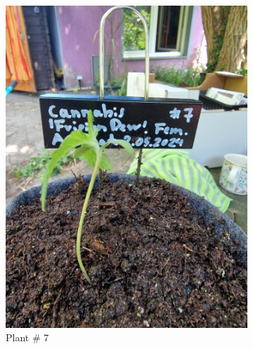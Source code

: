 \begin{figure}[htbp]
\begin{subfigure}[t]{.19\textwidth}
        \includegraphics[width=\linewidth]{plant_07_2024-05-13}
        \caption{Plant \# 7}
        \label{fig:plant_07_2024-05-13}
    \end{subfigure}
    \begin{subfigure}[t]{.19\textwidth}

\end{subfigure}
\end{figure}
